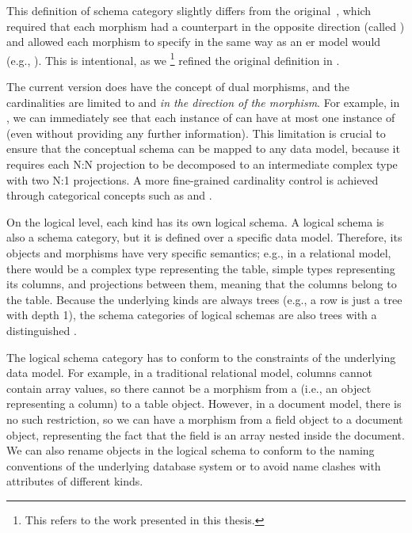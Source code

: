 This definition of schema category slightly differs from the original~\citep{mm_cat, mm_cat_journal}, which required that each morphism had a counterpart in the opposite direction (called ) and allowed each morphism to specify  in the same way as an \acrshort{er} model would (e.g., ). This is intentional, as we%
\footnote{This  refers to the work presented in this thesis.}
refined the original definition in .

The current version does have the concept of dual morphisms, and the cardinalities are limited to  and  \emph{in the direction of the morphism}. For example, in , we can immediately see that each instance of  can have at most one instance of  (even without providing any further information). This limitation is crucial to ensure that the conceptual schema can be mapped to any data model, because it requires each N:N projection to be decomposed to an intermediate complex type with two N:1 projections. A more fine-grained cardinality control is achieved through categorical concepts such as  and .

On the logical level, each kind has its own logical schema. A logical schema is also a schema category, but it is defined over a specific data model. Therefore, its objects and morphisms have very specific semantics; e.g., in a relational model, there would be a complex type representing the table, simple types representing its columns, and projections between them, meaning that the columns belong to the table. Because the underlying kinds are always trees (e.g., a row is just a tree with depth 1), the schema categories of logical schemas are also trees with a distinguished .

The logical schema category has to conform to the constraints of the underlying data model. For example, in a traditional relational model, columns cannot contain array values, so there cannot be a morphism from a  (i.e., an object representing a column) to a table object. However, in a document model, there is no such restriction, so we can have a morphism from a field object to a document object, representing the fact that the field is an array nested inside the document. We can also rename objects in the logical schema to conform to the naming conventions of the underlying database system or to avoid name clashes with attributes of different kinds.

